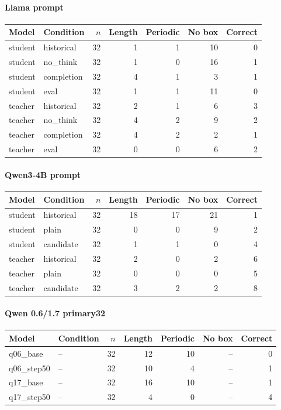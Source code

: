 \paragraph{Llama prompt}
{\small\setlength{\tabcolsep}{4pt}
\begin{longtable}{@{}llrrrrr@{}}
\toprule
Model & Condition & $n$ & Length & Periodic & No box & Correct \\
\midrule\endhead
student & historical & 32 & 1 & 1 & 10 & 0 \\
student & no\_\allowbreak{}think & 32 & 1 & 0 & 16 & 1 \\
student & completion & 32 & 4 & 1 & 3 & 1 \\
student & eval & 32 & 1 & 1 & 11 & 0 \\
teacher & historical & 32 & 2 & 1 & 6 & 3 \\
teacher & no\_\allowbreak{}think & 32 & 4 & 2 & 9 & 2 \\
teacher & completion & 32 & 4 & 2 & 2 & 1 \\
teacher & eval & 32 & 0 & 0 & 6 & 2 \\
\bottomrule\end{longtable}
}
\paragraph{Qwen3-4B prompt}
{\small\setlength{\tabcolsep}{4pt}
\begin{longtable}{@{}llrrrrr@{}}
\toprule
Model & Condition & $n$ & Length & Periodic & No box & Correct \\
\midrule\endhead
student & historical & 32 & 18 & 17 & 21 & 1 \\
student & plain & 32 & 0 & 0 & 9 & 2 \\
student & candidate & 32 & 1 & 1 & 0 & 4 \\
teacher & historical & 32 & 2 & 0 & 2 & 6 \\
teacher & plain & 32 & 0 & 0 & 0 & 5 \\
teacher & candidate & 32 & 3 & 2 & 2 & 8 \\
\bottomrule\end{longtable}
}
\paragraph{Qwen 0.6/1.7 primary32}
{\small\setlength{\tabcolsep}{4pt}
\begin{longtable}{@{}llrrrrr@{}}
\toprule
Model & Condition & $n$ & Length & Periodic & No box & Correct \\
\midrule\endhead
q06\_\allowbreak{}base & -- & 32 & 12 & 10 & -- & 0 \\
q06\_\allowbreak{}step50 & -- & 32 & 10 & 4 & -- & 1 \\
q17\_\allowbreak{}base & -- & 32 & 16 & 10 & -- & 1 \\
q17\_\allowbreak{}step50 & -- & 32 & 4 & 0 & -- & 4 \\
\bottomrule\end{longtable}
}
